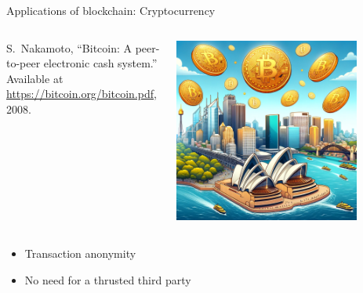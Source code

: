 \documentclass{beamer}
\begin{document}
\begin{frame}{Applications of blockchain: Cryptocurrency}
\begin{columns}
\begin{column}{0.5\textwidth}
   
{\footnotesize
\begin{thebibliography}{1}
S.~Nakamoto, ``Bitcoin: A peer-to-peer electronic cash system.'' Available at
  \href{https://bitcoin.org/bitcoin.pdf}{https://bitcoin.org/bitcoin.pdf},
  2008.
\end{thebibliography}  
}
\end{column}
\begin{column}{0.5\textwidth}  %
    \begin{center}
     \includegraphics[width=0.8\textwidth]{../../Figures/DALL-E/BTC_opera_house_sydney_skyline.png}
     \end{center}
\end{column}
\end{columns}
\begin{itemize}
  \item Transaction anonymity
  \item No need for a thrusted third party
\end{itemize}


\end{frame}
\end{document}
